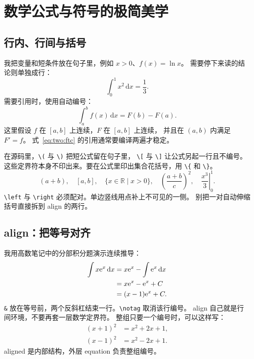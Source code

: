 \chapter{数学公式与符号的极简美学}

\section{行内、行间与括号}
我把变量和短条件放在句子里，例如 \(x>0\)、\(f(x)=\ln x\)。
需要停下来读的结论则单独成行：
\[
  \int_0^1x^2\,\mathrm{d}x=\frac13.
\]
需要引用时，使用自动编号：
\begin{equation}\label{eq:two:ftc}
  \int_a^b f(x)\,\mathrm{d}x=F(b)-F(a).
\end{equation}
这里假设 \(f\) 在 \([a,b]\) 上连续，\(F\) 在 \([a,b]\) 上连续，
并且在 \((a,b)\) 内满足 \(F'=f\)。
式~\eqref{eq:two:ftc} 的引用通常要编译两遍才稳定。

在源码里，\verb|\(| 与 \verb|\)| 把短公式留在句子里，
\verb|\[| 与 \verb|\]| 让公式另起一行且不编号。
这些定界符本身不印出来。要在公式里印出集合花括号，用 \verb|\{| 和 \verb|\}|。
\[
  (a+b),\quad [a,b],\quad \{x\in\mathbb R\mid x>0\},
  \quad \left(\frac{a+b}{c}\right)^2,
  \quad \left.\frac{x^3}{3}\right|_0^1.
\]
\verb|\left| 与 \verb|\right| 必须配对。单边竖线用点补上不可见的一侧。
别把一对自动伸缩括号直接拆到 align 的两行。

\section{align：把等号对齐}
我用高数笔记中的分部积分题演示连续推导：
\begin{align}
  \int x\mathrm{e}^x\,\mathrm{d}x
    &=x\mathrm{e}^x-\int\mathrm{e}^x\,\mathrm{d}x\notag\\
    &=x\mathrm{e}^x-\mathrm{e}^x+C\notag\\
    &=(x-1)\mathrm{e}^x+C.
\end{align}
\verb|&| 放在等号前，两个反斜杠结束一行。\verb|\notag| 取消该行编号。
align 自己就是行间环境，不要再套一层数学定界符。
整组只要一个编号时，可以这样写：
\begin{equation}
  \begin{aligned}
    (x+1)^2&=x^2+2x+1,\\
    (x-1)^2&=x^2-2x+1.
  \end{aligned}
\end{equation}
aligned 是内部结构，外层 equation 负责整组编号。

